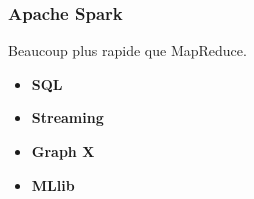 \begin{frame}
  \frametitle{Apache Spark}
  Beaucoup plus rapide que MapReduce.
  \begin{itemize}
  \item \textbf{SQL}
  \item \textbf{Streaming}
  \item \textbf{Graph X}
  \item \textbf{MLlib}
  \end{itemize}
\end{frame}
